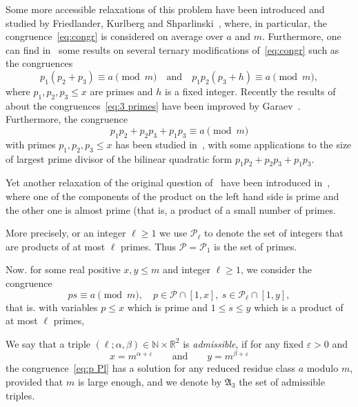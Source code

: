 \documentclass[12pt]{amsart}
\begin{document}
Some more accessible relaxations of this problem 
have been introduced  and studied by Friedlander,   Kurlberg and  Shparlinski~\cite{FrKuSh}, where, in particular, 
the congruence~\eqref{eq:congr}  is considered on average over $a$ and $m$. 
Furthermore, one can find in~\cite{FrKuSh} some results on several ternary modifications of~\eqref{eq:congr} 
such as the congruences
\begin{equation}
\label{eq:3 primes}
p_1(p_2+p_3) \equiv a \pmod m \quad \text{and}\quad p_1p_2(p_3+h) \equiv a \pmod m,
\end{equation}
where $p_1,p_2,p_3 \le x$ are primes and $h$ is a fixed integer. Recently the results
of~\cite{FrKuSh} about the congruences~\eqref{eq:3 primes}
have been improved by Garaev~\cite{Gar1,Gar2}. Furthermore, 
the congruence
$$
p_1p_2+p_2p_3+ p_1 p_3  \equiv a \pmod m
$$
with primes $p_1,p_2,p_3 \le x$ has been studied in~\cite{Bak,FoSh}, with some applications
to the size of largest prime divisor of the bilinear quadratic form $p_1p_2+p_2p_3+ p_1 p_3$. 
 

Yet another relaxation of the original question 
of~\cite{EOS}  have been introduced in~\cite{Shp},  where one of the components 
of the product on the left hand side is prime and the other one is
almost prime (that is, a product of a small number of primes. 

More precisely, or an integer $\ell \ge 1$ we use ${{\mathcal P}}_\ell$ to denote the set of 
integers that are products of at most $\ell$ primes. Thus ${{\mathcal P}}={{\mathcal P}}_1$ is the set 
of primes.

Now. for some real positive $x,y \le m$ and integer $\ell \ge 1$, 
we consider the congruence
\begin{equation}
\label{eq:p Pl}
p s \equiv a \pmod m, \quad p \in {{\mathcal P}}  \cap [1,x], \  s \in {{\mathcal P}}_\ell \cap [1,y], 
\end{equation}
that is. with variables   $p \le x$ which is prime and $1 \le s \le y$ which is a product of at most $\ell$ primes,

\begin{definition}
\label{def:triple} 
We say that a triple $(\ell; \alpha, \beta) \in {{\mathbb N}} \times {{\mathbb R}}^2$ is {\it admissible\/}, 
if for any fixed $\varepsilon > 0$ and 
$$x = m^{\alpha+\varepsilon} {\qquad\mbox{and}\qquad} y = m^{\beta+\varepsilon}
$$ 
the congruence~\eqref{eq:p Pl}
has a solution for any reduced residue class $a$ modulo $m$, provided that $m$ is
large enough, and we denote by ${{\mathfrak A}}_3$ the set of admissible triples. 
\end{definition}
\end{document}
